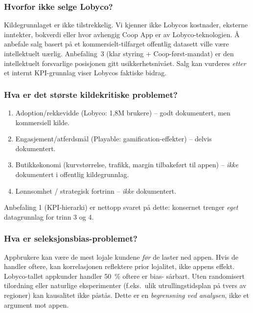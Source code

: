 \subsubsection*{\guillemotleft{}Hvorfor ikke selge Lobyco?\guillemotright{}}
Kildegrunnlaget er ikke tilstrekkelig. Vi kjenner ikke Lobycos kostnader,
eksterne inntekter, bokverdi eller hvor avhengig Coop App er av
Lobyco-teknologien. Å anbefale salg basert på et kommersielt-tilfarget
offentlig datasett ville være intellektuelt uærlig. Anbefaling~3 (klar
styring + Coop-først-mandat) er den intellektuelt forsvarlige posisjonen
gitt usikkerhetsnivået. Salg kan vurderes \emph{etter} et internt
KPI-grunnlag viser Lobycos faktiske bidrag.

\subsubsection*{\guillemotleft{}Hva er det største kildekritiske problemet?\guillemotright{}}
\begin{enumerate}
  \item Adoption/rekkevidde (Lobyco: 1{,}8M brukere) -- godt dokumentert,
    men kommersiell kilde.
  \item Engasjement/atferdsmål (Playable: gamification-effekter) -- delvis
    dokumentert.
  \item Butikkøkonomi (kurvstørrelse, trafikk, margin tilbakeført til
    appen) -- \emph{ikke} dokumentert i offentlig kildegrunnlag.
  \item Lønnsomhet / strategisk fortrinn -- \emph{ikke} dokumentert.
\end{enumerate}
Anbefaling 1 (KPI-hierarki) er nettopp svaret på dette: konsernet trenger
\emph{eget} datagrunnlag for trinn 3 og 4.

\subsubsection*{\guillemotleft{}Hva er seleksjonsbias-problemet?\guillemotright{}}
Appbrukere kan være de mest lojale kundene \emph{før} de laster ned appen.
Hvis de handler oftere, kan korrelasjonen reflektere prior lojalitet, ikke
appens effekt. Lobyco-tallet \guillemotleft{}appkunder handler 50~\% oftere\guillemotright{} er bias-
sårbart. Uten randomisert tilordning eller naturlige eksperimenter (f.eks.\
ulik utrullingstidsplan på tvers av regioner) kan kausalitet ikke
påstås. Dette er en \emph{begrensning ved analysen}, ikke et argument mot
appen.

